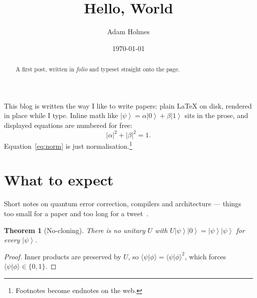 \documentclass[11pt]{article}
\title{Hello, World}
\author{Adam Holmes}
\date{\today}
\newtheorem{theorem}{Theorem}
\newcommand{\ket}[1]{\left|#1\right\rangle}
\begin{document}
\maketitle

\begin{abstract}
A first post, written in \emph{folio} and typeset straight onto the page.
\end{abstract}

This blog is written the way I like to write papers: plain \LaTeX{} on disk, rendered in place
while I type. Inline math like $\ket{\psi} = \alpha\ket{0} + \beta\ket{1}$ sits in the prose,
and displayed equations are numbered for free:
\begin{equation}
  |\alpha|^2 + |\beta|^2 = 1 .
  \label{eq:norm}
\end{equation}
Equation~\eqref{eq:norm} is just normalisation.\footnote{Footnotes become endnotes on the web.}

\section{What to expect}
Short notes on quantum error correction, compilers and architecture --- things too small
for a paper and too long for a tweet~\cite{shor1995}.

\begin{theorem}[No-cloning]
\label{thm:nc}
There is no unitary $U$ with $U\ket{\psi}\ket{0} = \ket{\psi}\ket{\psi}$ for every $\ket{\psi}$.
\end{theorem}
\begin{proof}
Inner products are preserved by $U$, so $\langle\psi|\phi\rangle = \langle\psi|\phi\rangle^2$,
which forces $\langle\psi|\phi\rangle \in \{0, 1\}$.
\end{proof}



\end{document}
